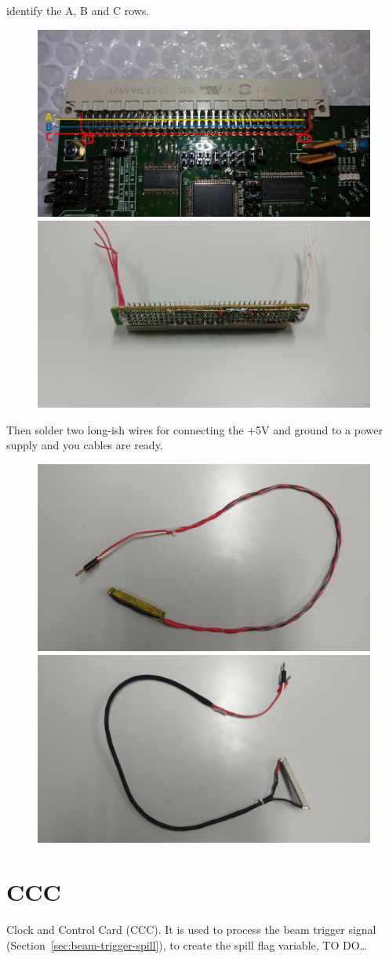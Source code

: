 \begin{enumerate}
  identify the A, B and C rows.
  \begin{figure}[H]
    \centering \includegraphics[width=0.48\linewidth,
    frame]{power-connector-connector}\hfill
    \includegraphics[width=0.48\linewidth, frame]{power-connector-connections}
  \end{figure}
  Then solder two long-ish wires for connecting the +5V and ground to a power
  supply and you cables are ready.
  \begin{figure}[H]
    \centering \includegraphics[width=0.48\linewidth,
    frame]{power-connector-cable-1}\hfill \includegraphics[width=0.48\linewidth,
    frame]{power-connector-cable-2}
  \end{figure}
\end{enumerate}


\section{CCC}
Clock and Control Card (CCC). It is used to process the beam trigger signal
(Section~\ref{sec:beam-trigger-spill}), to create the spill flag variable, TO DO\dots

